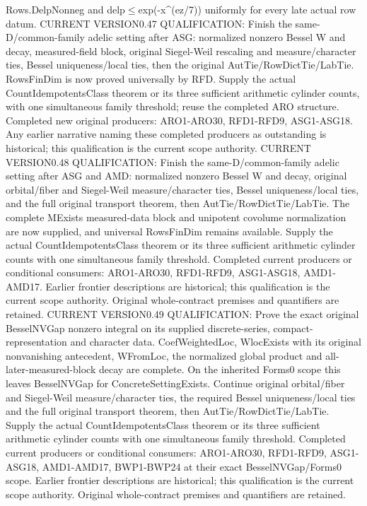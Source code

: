 Rows.DelpNonneg and delp$\le$exp(-x\textasciicircum{}(ez/7)) uniformly for every late actual row datum. CURRENT VERSION0.47 QUALIFICATION: Finish the same-D/common-family adelic setting after ASG: normalized nonzero Bessel W and decay, measured-field block, original Siegel-Weil rescaling and measure/character ties, Bessel uniqueness/local ties, then the original AutTie/RowDictTie/LabTie. RowsFinDim is now proved universally by RFD. Supply the actual CountIdempotentsClass theorem or its three sufficient arithmetic cylinder counts, with one simultaneous family threshold; reuse the completed ARO structure. Completed new original producers: ARO1-ARO30, RFD1-RFD9, ASG1-ASG18. Any earlier narrative naming these completed producers as outstanding is historical; this qualification is the current scope authority. CURRENT VERSION0.48 QUALIFICATION: Finish the same-D/common-family adelic setting after ASG and AMD: normalized nonzero Bessel W and decay, original orbital/fiber and Siegel-Weil measure/character ties, Bessel uniqueness/local ties, and the full original transport theorem, then AutTie/RowDictTie/LabTie. The complete MExists measured-data block and unipotent covolume normalization are now supplied, and universal RowsFinDim remains available. Supply the actual CountIdempotentsClass theorem or its three sufficient arithmetic cylinder counts with one simultaneous family threshold. Completed current producers or conditional consumers: ARO1-ARO30, RFD1-RFD9, ASG1-ASG18, AMD1-AMD17. Earlier frontier descriptions are historical; this qualification is the current scope authority. Original whole-contract premises and quantifiers are retained. CURRENT VERSION0.49 QUALIFICATION: Prove the exact original BesselNVGap nonzero integral on its supplied discrete-series, compact-representation and character data. CoefWeightedLoc, WlocExists with its original nonvanishing antecedent, WFromLoc, the normalized global product and all-later-measured-block decay are complete. On the inherited Forms0 scope this leaves BesselNVGap for ConcreteSettingExists. Continue original orbital/fiber and Siegel-Weil measure/character ties, the required Bessel uniqueness/local ties and the full original transport theorem, then AutTie/RowDictTie/LabTie. Supply the actual CountIdempotentsClass theorem or its three sufficient arithmetic cylinder counts with one simultaneous family threshold. Completed current producers or conditional consumers: ARO1-ARO30, RFD1-RFD9, ASG1-ASG18, AMD1-AMD17, BWP1-BWP24 at their exact BesselNVGap/Forms0 scope. Earlier frontier descriptions are historical; this qualification is the current scope authority. Original whole-contract premises and quantifiers are retained.

